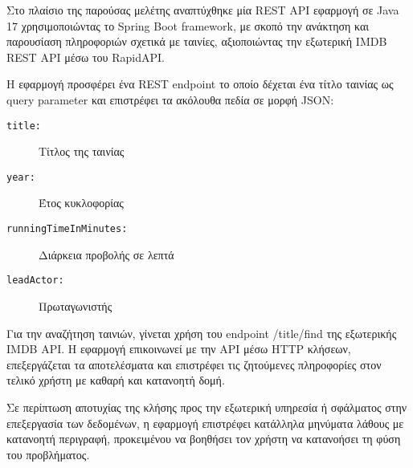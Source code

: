 Στο πλαίσιο της παρούσας μελέτης αναπτύχθηκε μία REST API εφαρμογή σε Java 17 χρησιμοποιώντας το Spring Boot framework, με σκοπό την ανάκτηση και παρουσίαση πληροφοριών σχετικά με ταινίες, αξιοποιώντας την εξωτερική IMDB REST API μέσω του RapidAPI. 

Η εφαρμογή προσφέρει ένα REST endpoint το οποίο δέχεται ένα τίτλο ταινίας ως query parameter και επιστρέφει τα ακόλουθα πεδία σε μορφή JSON:

\begin{description}
    \item[\texttt{title:}] Τίτλος της ταινίας
    \item[\texttt{year:}] Έτος κυκλοφορίας
    \item[\texttt{runningTimeInMinutes:}] Διάρκεια προβολής σε λεπτά
    \item[\texttt{leadActor:}] Πρωταγωνιστής
\end{description}

Για την αναζήτηση ταινιών, γίνεται χρήση του endpoint /title/find της εξωτερικής IMDB API. Η εφαρμογή επικοινωνεί με την API μέσω HTTP κλήσεων, επεξεργάζεται τα αποτελέσματα και επιστρέφει τις ζητούμενες πληροφορίες στον τελικό χρήστη με καθαρή και κατανοητή δομή.

Σε περίπτωση αποτυχίας της κλήσης προς την εξωτερική υπηρεσία ή σφάλματος στην επεξεργασία των δεδομένων, η εφαρμογή επιστρέφει κατάλληλα μηνύματα λάθους με κατανοητή περιγραφή, προκειμένου να βοηθήσει τον χρήστη να κατανοήσει τη φύση του προβλήματος.